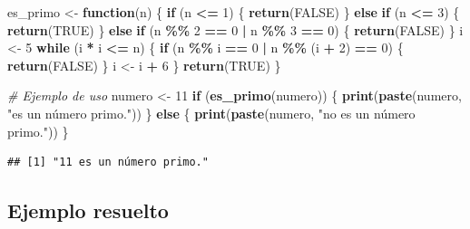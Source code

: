 \documentclass[
]{book}
\newenvironment{Shaded}{\begin{snugshade}}{\end{snugshade}}
\newcommand{\CommentTok}[1]{\textcolor[rgb]{0.56,0.35,0.01}{\textit{#1}}}
\newcommand{\ConstantTok}[1]{\textcolor[rgb]{0.56,0.35,0.01}{#1}}
\newcommand{\ControlFlowTok}[1]{\textcolor[rgb]{0.13,0.29,0.53}{\textbf{#1}}}
\newcommand{\DecValTok}[1]{\textcolor[rgb]{0.00,0.00,0.81}{#1}}
\newcommand{\FunctionTok}[1]{\textcolor[rgb]{0.13,0.29,0.53}{\textbf{#1}}}
\newcommand{\NormalTok}[1]{#1}
\newcommand{\OtherTok}[1]{\textcolor[rgb]{0.56,0.35,0.01}{#1}}
\newcommand{\SpecialCharTok}[1]{\textcolor[rgb]{0.81,0.36,0.00}{\textbf{#1}}}
\newcommand{\StringTok}[1]{\textcolor[rgb]{0.31,0.60,0.02}{#1}}
\begin{document}
\begin{Shaded}
\begin{Highlighting}[]
\NormalTok{es\_primo }\OtherTok{\textless{}{-}} \ControlFlowTok{function}\NormalTok{(n) \{}
  \ControlFlowTok{if}\NormalTok{ (n }\SpecialCharTok{\textless{}=} \DecValTok{1}\NormalTok{) \{}
    \FunctionTok{return}\NormalTok{(}\ConstantTok{FALSE}\NormalTok{)}
\NormalTok{  \} }\ControlFlowTok{else} \ControlFlowTok{if}\NormalTok{ (n }\SpecialCharTok{\textless{}=} \DecValTok{3}\NormalTok{) \{}
    \FunctionTok{return}\NormalTok{(}\ConstantTok{TRUE}\NormalTok{)}
\NormalTok{  \} }\ControlFlowTok{else} \ControlFlowTok{if}\NormalTok{ (n }\SpecialCharTok{\%\%} \DecValTok{2} \SpecialCharTok{==} \DecValTok{0} \SpecialCharTok{|}\NormalTok{ n }\SpecialCharTok{\%\%} \DecValTok{3} \SpecialCharTok{==} \DecValTok{0}\NormalTok{) \{}
    \FunctionTok{return}\NormalTok{(}\ConstantTok{FALSE}\NormalTok{)}
\NormalTok{  \}}
\NormalTok{  i }\OtherTok{\textless{}{-}} \DecValTok{5}
  \ControlFlowTok{while}\NormalTok{ (i }\SpecialCharTok{*}\NormalTok{ i }\SpecialCharTok{\textless{}=}\NormalTok{ n) \{}
    \ControlFlowTok{if}\NormalTok{ (n }\SpecialCharTok{\%\%}\NormalTok{ i }\SpecialCharTok{==} \DecValTok{0} \SpecialCharTok{|}\NormalTok{ n }\SpecialCharTok{\%\%}\NormalTok{ (i }\SpecialCharTok{+} \DecValTok{2}\NormalTok{) }\SpecialCharTok{==} \DecValTok{0}\NormalTok{) \{}
      \FunctionTok{return}\NormalTok{(}\ConstantTok{FALSE}\NormalTok{)}
\NormalTok{    \}}
\NormalTok{    i }\OtherTok{\textless{}{-}}\NormalTok{ i }\SpecialCharTok{+} \DecValTok{6}
\NormalTok{  \}}
  \FunctionTok{return}\NormalTok{(}\ConstantTok{TRUE}\NormalTok{)}
\NormalTok{\}}

\CommentTok{\# Ejemplo de uso}
\NormalTok{numero }\OtherTok{\textless{}{-}} \DecValTok{11}
\ControlFlowTok{if}\NormalTok{ (}\FunctionTok{es\_primo}\NormalTok{(numero)) \{}
  \FunctionTok{print}\NormalTok{(}\FunctionTok{paste}\NormalTok{(numero, }\StringTok{"es un número primo."}\NormalTok{))}
\NormalTok{\} }\ControlFlowTok{else}\NormalTok{ \{}
  \FunctionTok{print}\NormalTok{(}\FunctionTok{paste}\NormalTok{(numero, }\StringTok{"no es un número primo."}\NormalTok{))}
\NormalTok{\}}
\end{Highlighting}
\end{Shaded}

\begin{verbatim}
## [1] "11 es un número primo."
\end{verbatim}

\subsection{Ejemplo resuelto}\label{ejemplo-resuelto}
\end{document}
